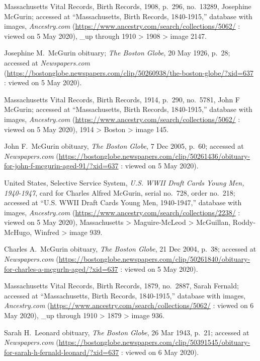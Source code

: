 \begin{thebibliography}{999}
	Massachusetts Vital Records, Birth Records, 1908, p.\ 296, no.\ 13289, Josephine McGurin; accessed at ``Massachusetts, Birth Records, 1840-1915,'' database with images, \textit{Ancestry.com} (\url{https://www.ancestry.com/search/collections/5062/} : viewed on 5 May 2020), \_up through 1910 > 1908 > image 2147.	
	
	Josephine M.\ McGurin obituary; \textit{The Boston Globe}, 20 May 1926, p.\ 28; accessed at \textit{Newspapers.com} (\url{https://bostonglobe.newspapers.com/clip/50260938/the-boston-globe/?xid=637} : viewed on 5 May 2020).
	
	Massachusetts Vital Records, Birth Records, 1914, p.\ 290, no.\ 5781, John F McGurin; accessed at ``Massachusetts, Birth Records, 1840-1915,'' database with images, \textit{Ancestry.com} (\url{https://www.ancestry.com/search/collections/5062/} : viewed on 5 May 2020), 1914 > Boston > image 145.	
	
	John F.\ McGurin obituary, \textit{The Boston Globe}, 7 Dec 2005, p.\ 60; accessed at \textit{Newspapers.com} (\url{https://bostonglobe.newspapers.com/clip/50261436/obituary-for-john-f-mcgurin-aged-91/?xid=637} : viewed on 5 May 2020).
	
	United States, Selective Service System, \textit{U.S. WWII Draft Cards Young Men, 1940-1947}, card for Charles Alfred McGurin, serial no.\ 728, order no.\ 218; accessed at ``U.S. WWII Draft Cards Young Men, 1940-1947,'' database with images, \textit{Ancestry.com} (\url{https://www.ancestry.com/search/collections/2238/} : viewed on 5 May 2020), Massachusetts > Maguire-McLeod > McGuillan, Roddy-McHugo, Winfred > image 939.
	
	Charles A.\ McGurin obituary, \textit{The Boston Globe}, 21 Dec 2004, p.\ 38; accessed at \textit{Newspapers.com} (\url{https://bostonglobe.newspapers.com/clip/50261840/obituary-for-charles-a-mcgurln-aged/?xid=637} : viewed on 5 May 2020).
	
	Massachusetts Vital Records, Birth Records, 1879, no.\ 2887, Sarah Fernald; accessed at ``Massachusetts, Birth Records, 1840-1915,'' database with images, \textit{Ancestry.com} (\url{https://www.ancestry.com/search/collections/5062/} : viewed on 6 May 2020), \_up through 1910 > 1879 > image 936.
	
	Sarah H.\ Leonard obituary, \textit{The Boston Globe}, 26 Mar 1943, p.\ 21; accessed at \textit{Newspapers.com} (\url{https://bostonglobe.newspapers.com/clip/50391545/obituary-for-sarah-h-fernald-leonard/?xid=637} : viewed on 6 May 2020).
	

\end{thebibliography}
